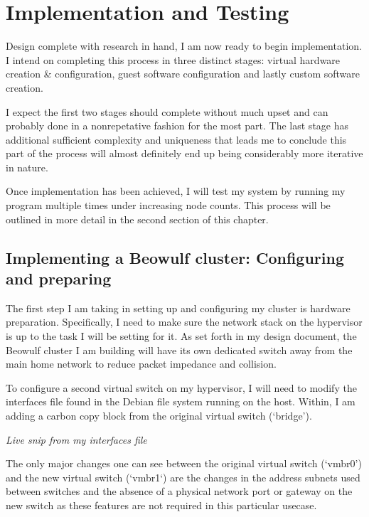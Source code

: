 \cleardoublepage
{}
\chapter{Implementation and Testing}
Design complete with research in hand, I am now ready to begin implementation. I intend on completing this process in three distinct stages: virtual hardware creation \& configuration, guest software configuration and lastly custom software creation.

I expect the first two stages should complete without much upset and can probably done in a nonrepetative fashion for the most part. The last stage has additional sufficient complexity and uniqueness that leads me to conclude this part of the process will almost definitely end up being considerably more iterative in nature.

Once implementation has been achieved, I will test my system by running my program multiple times under increasing node counts. This process will be outlined in more detail in the second section of this chapter.

\section{Implementing a Beowulf cluster: Configuring and preparing}

\textbf{}

The first step I am taking in setting up and configuring my cluster is hardware preparation. Specifically, I need to make sure the network stack on the hypervisor is up to the task I will be setting for it. As set forth in my design document, the Beowulf cluster I am building will have its own dedicated switch away from the main home network to reduce packet impedance and collision.

To configure a second virtual switch on my hypervisor, I will need to modify the interfaces file found in the Debian file system running on the host. Within, I am adding a carbon copy block from the original virtual switch (`bridge').


\begin{center}
    \emph{Live snip from my interfaces file}
\end{center}
\vfill\break

The only major changes one can see between the original virtual switch (`vmbr0') and the new virtual switch (`vmbr1`) are the changes in the address subnets used between switches and the absence of a physical network port or gateway on the new switch as these features are not required in this particular usecase.


